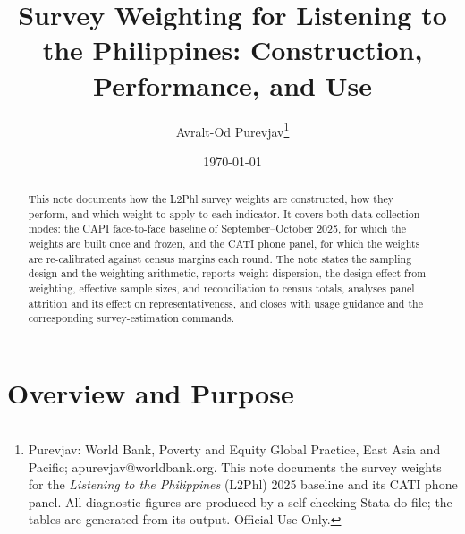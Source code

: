 \documentclass[AEJ]{AEA}
\begin{document}
\title{Survey Weighting for Listening to the Philippines:
Construction, Performance, and Use}
\author{Avralt-Od Purevjav\thanks{%
Purevjav: World Bank, Poverty and Equity Global Practice, East Asia and Pacific;
apurevjav@worldbank.org. This note documents the survey weights for the
\textit{Listening to the Philippines} (L2Phl) 2025 baseline and its CATI phone
panel. All diagnostic figures are produced by a self-checking Stata do-file; the
tables are generated from its output. Official Use Only.%
}}
\date{\today}
\pubVolume{}
\pubIssue{}

\begin{abstract}
This note documents how the L2Phl survey weights are constructed, how they
perform, and which weight to apply to each indicator. It covers both data
collection modes: the CAPI face-to-face baseline of September--October 2025, for
which the weights are built once and frozen, and the CATI phone panel, for which
the weights are re-calibrated against census margins each round. The note states
the sampling design and the weighting arithmetic, reports weight dispersion, the
design effect from weighting, effective sample sizes, and reconciliation to
census totals, analyses panel attrition and its effect on representativeness, and
closes with usage guidance and the corresponding survey-estimation commands.
\end{abstract}

\maketitle

\makeatletter
\def\@oddhead{{\small\textit{\hfil\@shortTitle\hfil}}\quad\thepage}
\def\@evenhead{\thepage\quad{\small\textit{\hfil\@shortTitle\hfil}}}
\makeatother

\section{Overview and Purpose}
\end{document}
